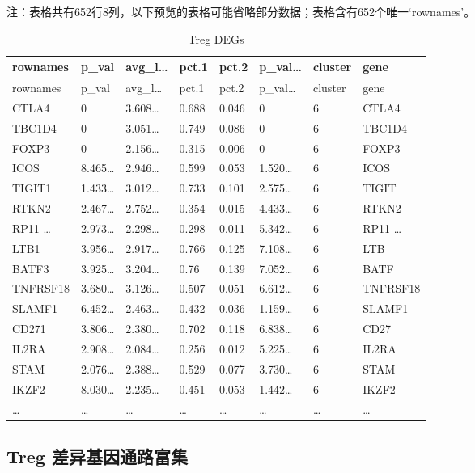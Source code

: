 \documentclass[
]{article}
\begin{document}
\begin{center}\begin{tcolorbox}[colback=gray!10, colframe=gray!50, width=0.9\linewidth, arc=1mm, boxrule=0.5pt]注：表格共有652行8列，以下预览的表格可能省略部分数据；表格含有652个唯一`rownames'。
\end{tcolorbox}
\end{center}

\begin{longtable}[]{@{}llllllll@{}}
\caption{\label{tab:Treg-DEGs}Treg DEGs}\tabularnewline
\toprule
rownames & p\_val & avg\_l\ldots{} & pct.1 & pct.2 & p\_val\ldots{} & cluster & gene\tabularnewline
\midrule
\endfirsthead
\toprule
rownames & p\_val & avg\_l\ldots{} & pct.1 & pct.2 & p\_val\ldots{} & cluster & gene\tabularnewline
\midrule
\endhead
CTLA4 & 0 & 3.608\ldots{} & 0.688 & 0.046 & 0 & 6 & CTLA4\tabularnewline
TBC1D4 & 0 & 3.051\ldots{} & 0.749 & 0.086 & 0 & 6 & TBC1D4\tabularnewline
FOXP3 & 0 & 2.156\ldots{} & 0.315 & 0.006 & 0 & 6 & FOXP3\tabularnewline
ICOS & 8.465\ldots{} & 2.946\ldots{} & 0.599 & 0.053 & 1.520\ldots{} & 6 & ICOS\tabularnewline
TIGIT1 & 1.433\ldots{} & 3.012\ldots{} & 0.733 & 0.101 & 2.575\ldots{} & 6 & TIGIT\tabularnewline
RTKN2 & 2.467\ldots{} & 2.752\ldots{} & 0.354 & 0.015 & 4.433\ldots{} & 6 & RTKN2\tabularnewline
RP11-\ldots{} & 2.973\ldots{} & 2.298\ldots{} & 0.298 & 0.011 & 5.342\ldots{} & 6 & RP11-\ldots{}\tabularnewline
LTB1 & 3.956\ldots{} & 2.917\ldots{} & 0.766 & 0.125 & 7.108\ldots{} & 6 & LTB\tabularnewline
BATF3 & 3.925\ldots{} & 3.204\ldots{} & 0.76 & 0.139 & 7.052\ldots{} & 6 & BATF\tabularnewline
TNFRSF18 & 3.680\ldots{} & 3.126\ldots{} & 0.507 & 0.051 & 6.612\ldots{} & 6 & TNFRSF18\tabularnewline
SLAMF1 & 6.452\ldots{} & 2.463\ldots{} & 0.432 & 0.036 & 1.159\ldots{} & 6 & SLAMF1\tabularnewline
CD271 & 3.806\ldots{} & 2.380\ldots{} & 0.702 & 0.118 & 6.838\ldots{} & 6 & CD27\tabularnewline
IL2RA & 2.908\ldots{} & 2.084\ldots{} & 0.256 & 0.012 & 5.225\ldots{} & 6 & IL2RA\tabularnewline
STAM & 2.076\ldots{} & 2.388\ldots{} & 0.529 & 0.077 & 3.730\ldots{} & 6 & STAM\tabularnewline
IKZF2 & 8.030\ldots{} & 2.235\ldots{} & 0.451 & 0.053 & 1.442\ldots{} & 6 & IKZF2\tabularnewline
\ldots{} & \ldots{} & \ldots{} & \ldots{} & \ldots{} & \ldots{} & \ldots{} & \ldots{}\tabularnewline
\bottomrule
\end{longtable}

\hypertarget{enrich}{%
\subsection{Treg 差异基因通路富集}\label{enrich}}
\end{document}
